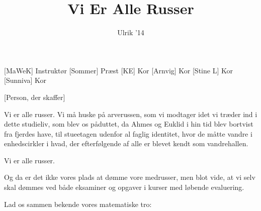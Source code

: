 \documentclass[a4paper,11pt]{article}
\title{Vi Er Alle Russer}
\author{Ulrik '14}
\begin{document}
\maketitle

\begin{roles}
[MaWeK] Instruktør
[Sommer] Præst
[KE] Kor
[Arnvig] Kor
[Stine L] Kor
[Sunniva] Kor
\end{roles}

\begin{props}
[Person, der skaffer]
\end{props}

\begin{sketch}


 Vi er alle russer.
Vi må huske på arverussen, som vi modtager idet vi træder ind i dette studieliv, som blev os påduttet, da Ahmes og Euklid i hin tid blev bortvist fra fjerdes have, til stueetagen udenfor al faglig identitet, hvor de måtte vandre i enhedscirkler i hvad, der efterfølgende af alle er blevet kendt som vandrehallen.

 Vi er alle russer.

 Og da er det ikke vores plads at dømme vore medrusser, men blot vide, at vi selv skal dømmes ved både eksaminer og opgaver i kurser med løbende evaluering.

 Lad os sammen bekende vores matematiske tro:



\end{sketch}
\end{document}
